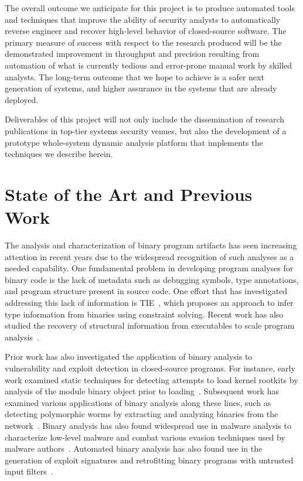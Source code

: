 \documentclass[letterpaper,twoside,11pt,headings=small]{scrartcl}
\begin{document}
The overall outcome we anticipate for this project is to produce automated
tools and techniques that improve the ability of security analysts to
automatically reverse engineer and recover high-level behavior of
closed-source software.  The primary measure of success with respect to the
research produced will be the demonstrated improvement in throughput and
precision resulting from automation of what is currently tedious and
error-prone manual work by skilled analysts.  The long-term outcome that we
hope to achieve is a safer next generation of systems, and higher assurance in
the systems that are already deployed.

Deliverables of this project will not only include the dissemination of
research publications in top-tier systems security venues, but also the
development of a prototype whole-system dynamic analysis platform that
implements the techniques we describe herein.

\section{State of the Art and Previous Work}
\label{sec:related}

The analysis and characterization of binary program artifacts has seen
increasing attention in recent years due to the widespread recognition of such
analyses as a needed capability.  One fundamental problem in developing
program analyses for binary code is the lack of metadata such as debugging
symbols, type annotations, and program structure present in source code. One
effort that has investigated addressing this lack of information is
TIE~\cite{lee:ndss2011:tie}, which proposes an approach to infer type
information from binaries using constraint solving.  Recent work has also
studied the recovery of structural information from executables to scale
program analysis~\cite{schwartz:2013:decomp}.

Prior work has also investigated the application of binary analysis to
vulnerability and exploit detection in closed-source programs.  For instance,
early work examined static techniques for detecting attempts to load kernel
rootkits by analysis of the module binary object prior to
loading~\cite{kruegel:acsac2004:kernel}.  Subsequent work has examined various
applications of binary analysis along these lines, such as detecting
polymorphic worms by extracting and analyzing binaries from the
network~\cite{kruegel:raid2005:worm}. Binary analysis has also found
widespread use in malware analysis to characterize low-level malware and
combat various evasion techniques used by malware
authors~\cite{moser:ssp2007:malware,bayer:ndss2009:malware,sharif:ssp2009:malware}.
Automated binary analysis has also found use in the generation of exploit
signatures and retrofitting binary programs with untrusted input
filters~\cite{newsome:ssp2005:filter,brumley:ssp2006:filter,brumley:csf2007:filter}.
\end{document}
